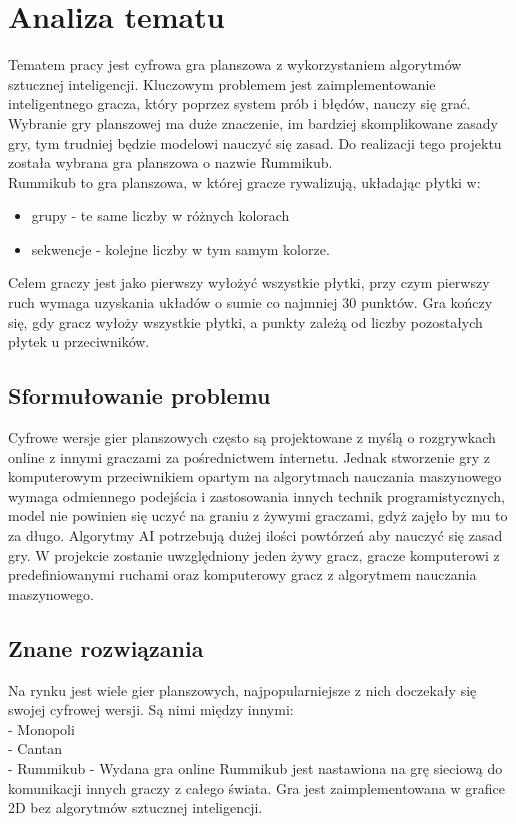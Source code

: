 \documentclass[a4paper,twoside,12pt]{book}
\begin{document}
\chapter{Analiza tematu}%
Tematem pracy jest cyfrowa gra planszowa z wykorzystaniem algorytmów sztucznej inteligencji. Kluczowym problemem jest zaimplementowanie inteligentnego gracza, który poprzez system prób i błędów, nauczy się grać. Wybranie gry planszowej ma duże znaczenie, im bardziej skomplikowane zasady gry, tym trudniej będzie modelowi nauczyć się zasad.
Do realizacji tego projektu została wybrana gra planszowa o nazwie Rummikub.\\ Rummikub to gra planszowa, w której gracze rywalizują, układając płytki w:
\begin{itemize}
 \item grupy - te same liczby w różnych kolorach 
 \item sekwencje - kolejne liczby w tym samym kolorze.
 \end{itemize} 
 Celem graczy jest jako pierwszy wyłożyć wszystkie płytki, przy czym pierwszy ruch wymaga uzyskania układów o sumie co najmniej 30 punktów. Gra kończy się, gdy gracz wyłoży wszystkie płytki, a punkty zależą od liczby pozostałych płytek u przeciwników.

\section{Sformułowanie problemu}
Cyfrowe wersje gier planszowych często są projektowane z myślą o rozgrywkach online z innymi graczami za pośrednictwem internetu. Jednak stworzenie gry z komputerowym przeciwnikiem opartym na algorytmach nauczania maszynowego wymaga odmiennego podejścia i zastosowania innych technik programistycznych, model nie powinien się uczyć na graniu z żywymi graczami, gdyż zajęło by mu to za długo. Algorytmy AI potrzebują dużej ilości powtórzeń aby nauczyć się zasad gry. W projekcie zostanie uwzględniony jeden żywy gracz, gracze komputerowi z predefiniowanymi ruchami oraz komputerowy gracz z algorytmem nauczania maszynowego.
\section{Znane rozwiązania}
Na rynku jest wiele gier planszowych, najpopularniejsze z nich doczekały się swojej cyfrowej wersji. Są nimi między innymi:\\
- Monopoli\\
- Cantan\\
- Rummikub
- Wydana gra online Rummikub jest nastawiona na grę sieciową do komunikacji innych graczy z całego świata. Gra jest zaimplementowana w grafice 2D bez algorytmów sztucznej inteligencji. 
\end{document}
